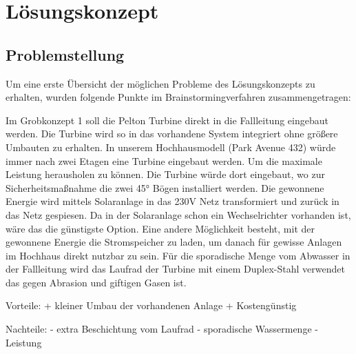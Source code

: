 \section{Lösungskonzept} \label{sec:luesungskonzept}

\subsection{Problemstellung} \label{subsec:problemstellung}
Um eine erste Übersicht der möglichen Probleme des Lösungskonzepts zu erhalten, wurden folgende Punkte im Brainstormingverfahren zusammengetragen:



Im Grobkonzept 1 soll die Pelton Turbine direkt in die Fallleitung eingebaut werden. Die Turbine wird so in das vorhandene System integriert ohne größere Umbauten zu erhalten.
In unserem Hochhausmodell (Park Avenue 432) würde immer nach zwei Etagen eine Turbine eingebaut werden. Um die maximale Leistung herausholen zu können. Die Turbine würde dort eingebaut, wo zur Sicherheitsmaßnahme die zwei 45° Bögen installiert werden. 
Die gewonnene Energie wird mittels Solaranlage in das 230V Netz transformiert und zurück in das Netz gespiesen. Da in der Solaranlage schon ein Wechselrichter vorhanden ist, wäre das die günstigste Option. Eine andere Möglichkeit besteht, mit der gewonnene Energie die Stromspeicher zu laden, um danach für gewisse Anlagen im Hochhaus direkt nutzbar zu sein.
Für die sporadische Menge vom Abwasser in der Fallleitung wird das Laufrad der Turbine mit einem Duplex-Stahl verwendet das gegen Abrasion und giftigen Gasen ist.


Vorteile:
+	kleiner Umbau der vorhandenen Anlage
+	Kostengünstig
	


Nachteile:
- 	extra Beschichtung vom Laufrad
-	sporadische Wassermenge
-	Leistung









